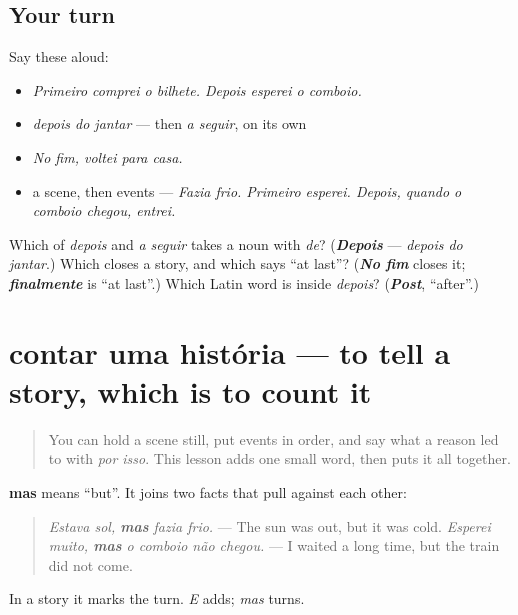 \subsection*{Your turn}
Say these aloud:

\begin{itemize}
\raggedright
  \item \emph{Primeiro comprei o bilhete. Depois esperei o comboio.}
  \item \emph{depois do jantar} — then \emph{a seguir}, on its own
  \item \emph{No fim, voltei para casa.}
  \item a scene, then events — \emph{Fazia frio. Primeiro esperei. Depois, quando o comboio chegou, entrei.}
\end{itemize}

\begin{tcolorbox}[breakable,colback=teal!4,colframe=teal!35!black,title={Before you move on}]
Which of \emph{depois} and \emph{a seguir} takes a noun with \emph{de}? (\emph{\textbf{Depois}} — \emph{depois do jantar}.) Which closes a story, and which says \textquotedblleft{}at last\textquotedblright{}? (\emph{\textbf{No fim}} closes it; \emph{\textbf{finalmente}} is \textquotedblleft{}at last\textquotedblright{}.) Which Latin word is inside \emph{depois}? (\emph{\textbf{Post}}, \textquotedblleft{}after\textquotedblright{}.)
\end{tcolorbox}
\section[contar uma história]{contar uma história — to tell a story, which is to count it}

\label{lesson:PT-C260-contar}



\begin{quote}
You can hold a scene still, put events in order, and say what a reason led to with \emph{por isso}. This lesson adds one small word, then puts it all together.
\end{quote}

\begin{grammarlens}[title={Grammar Lens: mas, the turn in a story}]
\textbf{mas} means \textquotedblleft{}but\textquotedblright{}. It joins two facts that pull against each other:

\begin{quote}
\emph{Estava sol, \textbf{mas} fazia frio.} — The sun was out, but it was cold. \emph{Esperei muito, \textbf{mas} o comboio não chegou.} — I waited a long time, but the train did not come.
\end{quote}

In a story it marks the turn. \emph{E} adds; \emph{mas} turns.
\end{grammarlens}

